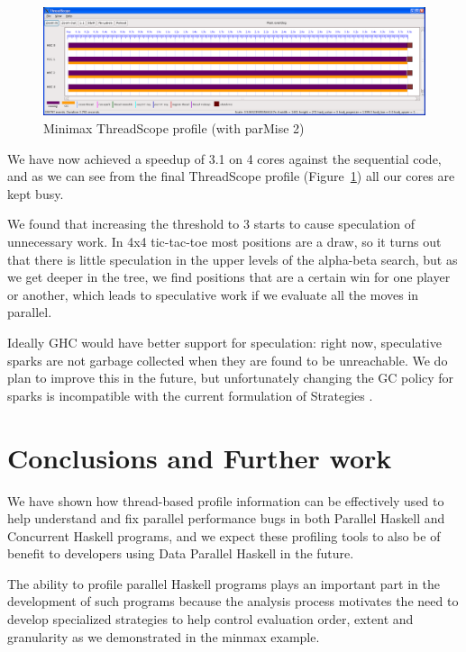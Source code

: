 \documentclass[twocolumn,9pt]{sigplanconf}
\let\cite=\citep
\begin{document}
\begin{figure}
\begin{center}
\includegraphics[scale=0.3]{minimax3.png}
\end{center}
\caption{Minimax ThreadScope profile (with parMise 2)}
\label{f:minimax-threadscope3}
\end{figure}

We have now achieved a speedup of 3.1 on 4 cores against the
sequential code, and as we can see from the final ThreadScope profile
(Figure~\ref{f:minimax-threadscope3}) all our cores are kept busy.

We found that increasing the threshold to 3 starts to cause
speculation of unnecessary work.  In 4x4 tic-tac-toe most positions
are a draw, so it turns out that there is little speculation in the
upper levels of the alpha-beta search, but as we get deeper in the
tree, we find positions that are a certain win for one player or
another, which leads to speculative work if we evaluate all the moves
in parallel.  

Ideally GHC would have better support for speculation: right now,
speculative sparks are not garbage collected when they are found to be
unreachable.  We do plan to improve this in the future, but
unfortunately changing the GC policy for sparks is incompatible with
the current formulation of Strategies \cite{multicore-ghc}.







\section{Conclusions and Further work}
\label{s:conclusion}
We have shown how thread-based profile information can be effectively
used to help understand and fix parallel performance bugs in both
Parallel Haskell and Concurrent Haskell programs, and we expect these
profiling tools to also be of benefit to developers using Data
Parallel Haskell in the future.

The ability to profile parallel Haskell programs plays an important
part in the development of such programs because the analysis
process motivates the need to develop specialized strategies to
help control evaluation order, extent and granularity as we demonstrated in
the minmax example.
\end{document}
